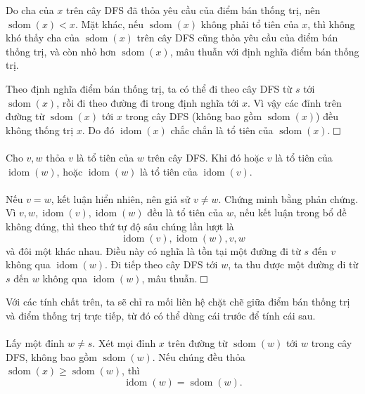 \documentclass[11pt]{article}
\newcommand{\proofbox}{\ensuremath{\vcenter{\hrule height 0.45pt
  \hbox{\vrule width 0.45pt height 6pt\kern 6pt\vrule width 0.45pt}
  \hrule height 0.45pt}}}
\begin{document}
Do cha của \(x\) trên cây DFS đã thỏa yêu cầu của điểm bán thống trị, nên
\(\operatorname{sdom}(x)<x\). Mặt khác, nếu \(\operatorname{sdom}(x)\) không
phải tổ tiên của \(x\), thì không khó thấy cha của \(\operatorname{sdom}(x)\)
trên cây DFS cũng thỏa yêu cầu của điểm bán thống trị, và còn nhỏ hơn
\(\operatorname{sdom}(x)\), mâu thuẫn với định nghĩa điểm bán thống trị.

Theo định nghĩa điểm bán thống trị, ta có thể đi theo cây DFS từ \(s\) tới
\(\operatorname{sdom}(x)\), rồi đi theo đường đi trong định nghĩa tới \(x\).
Vì vậy các đỉnh trên đường từ \(\operatorname{sdom}(x)\) tới \(x\) trong cây
DFS (không bao gồm \(\operatorname{sdom}(x)\)) đều không thống trị \(x\). Do đó
\(\operatorname{idom}(x)\) chắc chắn là tổ tiên của \(\operatorname{sdom}(x)\).
\proofbox

\paragraph{}
Cho \(v,w\) thỏa \(v\) là tổ tiên của \(w\) trên cây DFS. Khi đó hoặc \(v\) là
tổ tiên của \(\operatorname{idom}(w)\), hoặc \(\operatorname{idom}(w)\) là tổ
tiên của \(\operatorname{idom}(v)\).

\paragraph{}
Nếu \(v=w\), kết luận hiển nhiên, nên giả sử \(v\ne w\). Chứng minh bằng phản
chứng. Vì \(v,w,\operatorname{idom}(v),\operatorname{idom}(w)\) đều là tổ tiên
của \(w\), nếu kết luận trong bổ đề không đúng, thì theo thứ tự độ sâu chúng
lần lượt là
\[
\operatorname{idom}(v),\operatorname{idom}(w),v,w
\]
và đôi một khác nhau. Điều này có nghĩa là tồn tại một đường đi từ \(s\) đến
\(v\) không qua \(\operatorname{idom}(w)\). Đi tiếp theo cây DFS tới \(w\), ta
thu được một đường đi từ \(s\) đến \(w\) không qua \(\operatorname{idom}(w)\),
mâu thuẫn. \proofbox

Với các tính chất trên, ta sẽ chỉ ra mối liên hệ chặt chẽ giữa điểm bán thống
trị và điểm thống trị trực tiếp, từ đó có thể dùng cái trước để tính cái sau.

\paragraph{}
Lấy một đỉnh \(w\ne s\). Xét mọi đỉnh \(x\) trên đường từ
\(\operatorname{sdom}(w)\) tới \(w\) trong cây DFS, không bao gồm
\(\operatorname{sdom}(w)\). Nếu chúng đều thỏa
\(\operatorname{sdom}(x)\ge \operatorname{sdom}(w)\), thì
\[
\operatorname{idom}(w)=\operatorname{sdom}(w).
\]
\end{document}
